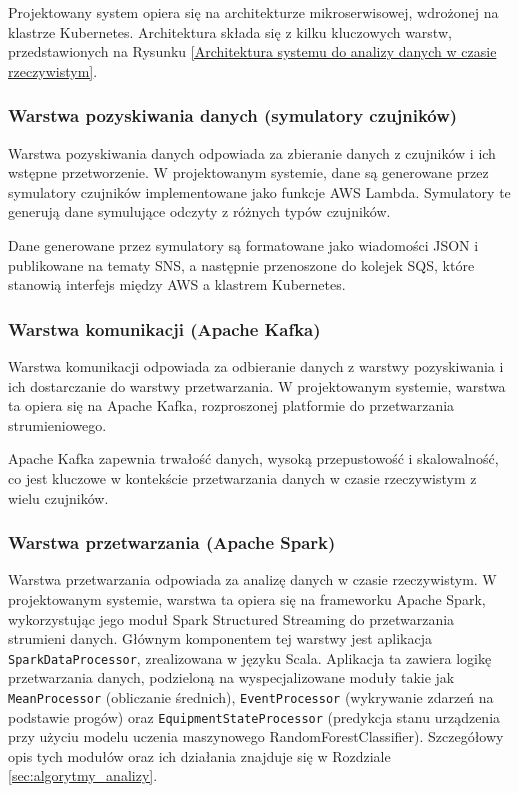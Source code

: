 Projektowany system opiera się na architekturze mikroserwisowej, wdrożonej na klastrze Kubernetes.
Architektura składa się z kilku kluczowych warstw, przedstawionych na Rysunku \ref{Architektura systemu do analizy danych w czasie rzeczywistym}.


\subsubsection{Warstwa pozyskiwania danych (symulatory czujników)}
\label{subsubsec:warstwa_pozyskiwania}

Warstwa pozyskiwania danych odpowiada za zbieranie danych z czujników i ich wstępne przetworzenie.
W projektowanym systemie, dane są generowane przez symulatory czujników implementowane jako funkcje AWS Lambda.
Symulatory te generują dane symulujące odczyty z różnych typów czujników.

Dane generowane przez symulatory są formatowane jako wiadomości JSON i publikowane na tematy SNS, a następnie przenoszone do kolejek SQS,
które stanowią interfejs między AWS a klastrem Kubernetes.

\subsubsection{Warstwa komunikacji (Apache Kafka)}
\label{subsubsec:warstwa_komunikacji}

Warstwa komunikacji odpowiada za odbieranie danych z warstwy pozyskiwania i ich dostarczanie do warstwy przetwarzania.
W projektowanym systemie, warstwa ta opiera się na Apache Kafka, rozproszonej platformie do przetwarzania strumieniowego.


Apache Kafka zapewnia trwałość danych, wysoką przepustowość i skalowalność, co jest kluczowe w kontekście przetwarzania danych w czasie rzeczywistym z wielu czujników.

\subsubsection{Warstwa przetwarzania (Apache Spark)}
\label{subsubsec:warstwa_przetwarzania}

Warstwa przetwarzania odpowiada za analizę danych w czasie rzeczywistym. W projektowanym systemie, warstwa ta opiera się na frameworku Apache Spark, wykorzystując jego moduł Spark Structured Streaming do przetwarzania strumieni danych. Głównym komponentem tej warstwy jest aplikacja \texttt{SparkDataProcessor}, zrealizowana w języku Scala. Aplikacja ta zawiera logikę przetwarzania danych, podzieloną na wyspecjalizowane moduły takie jak \texttt{MeanProcessor} (obliczanie średnich), \texttt{EventProcessor} (wykrywanie zdarzeń na podstawie progów) oraz \texttt{EquipmentStateProcessor} (predykcja stanu urządzenia przy użyciu modelu uczenia maszynowego RandomForestClassifier). Szczegółowy opis tych modułów oraz ich działania znajduje się w Rozdziale \ref{sec:algorytmy_analizy}.

